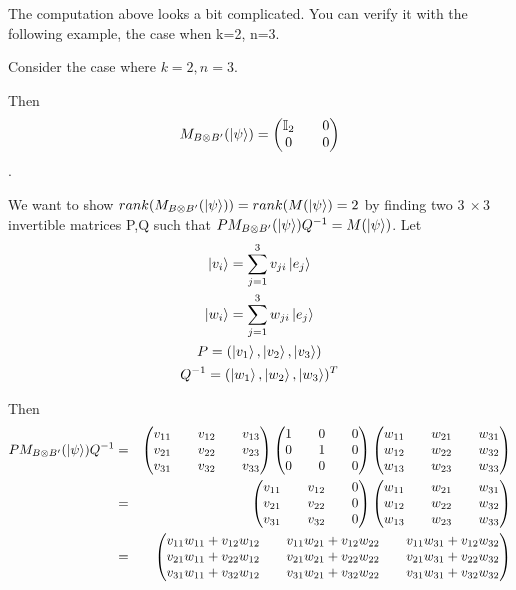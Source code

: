 The computation above looks a bit complicated. You can verify it with the following example, the case when k=2, n=3.
\begin{example}
Consider the case where $k=2, n=3$.

Then 
$$M_{B \otimes B'}(\ket{\psi})=\begin{pmatrix}
\mathbb{I}_2 && 0 \\
0 && 0
\end{pmatrix}$$.

We want to show $rank(M_{B \otimes B'}(\ket{\psi}))=rank(M(\ket{\psi})=2$ by finding two $3\  \times 3$ invertible matrices P,Q such that $PM_{B \otimes B'}(\ket{\psi})Q^{-1}=M(\ket{\psi})$.
Let
\begin{gather*}
\ket{v_i}=\sum_{j=1}^3 v_{ji}\ket{e_j}\\
\ket{w_i}=\sum_{j=1}^3 w_{ji}\ket{e_j}\\
P=(\ket{v_1}, \ket{v_2}, \ket{v_3})\\
Q^{-1}=(\ket{w_1}, \ket{w_2}, \ket{w_3})^T
\end{gather*}

Then
\begin{eqnarray*}
P M_{B \otimes B'}(\ket{\psi}) Q^{-1}&=&\begin{pmatrix}
v_{11} && v_{12} && v_{13}\\
v_{21} && v_{22} && v_{23}\\
v_{31} && v_{32} && v_{33}
\end{pmatrix}
\begin{pmatrix}
1 && 0 && 0\\
0 && 1 && 0\\
0 && 0 && 0\\
\end{pmatrix}
\begin{pmatrix}
w_{11} && w_{21} && w_{31}\\
w_{12} && w_{22} && w_{32}\\
w_{13} && w_{23} && w_{33}
\end{pmatrix}\\
&=&\begin{pmatrix}
v_{11} && v_{12} && 0\\
v_{21} && v_{22} && 0\\
v_{31} && v_{32} && 0
\end{pmatrix}
\begin{pmatrix}
w_{11} && w_{21} && w_{31}\\
w_{12} && w_{22} && w_{32}\\
w_{13} && w_{23} && w_{33}
\end{pmatrix}\\
&=&\begin{pmatrix}
v_{11}w_{11}+v_{12}w_{12} && v_{11}w_{21}+v_{12}w_{22} && v_{11}w_{31}+v_{12}w_{32}\\
v_{21}w_{11}+v_{22}w_{12} && v_{21}w_{21}+v_{22}w_{22} && v_{21}w_{31}+v_{22}w_{32} \\
v_{31}w_{11}+v_{32}w_{12} && v_{31}w_{21}+v_{32}w_{22} && v_{31}w_{31}+v_{32}w_{32} \\
\end{pmatrix}
\end{eqnarray*}



\end{example}
